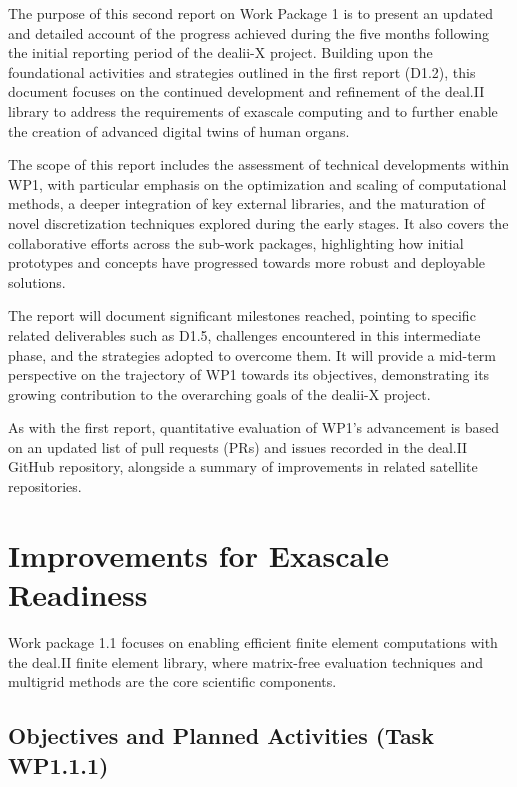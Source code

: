 \documentclass[a4paper,12pt]{article}
\begin{document}
The purpose of this second report on Work Package 1 is to present an updated and detailed account of the progress achieved during the five months following the initial reporting period of the dealii-X project. Building upon the foundational activities and strategies outlined in the first report (D1.2), this document focuses on the continued development and refinement of the deal.II library to address the requirements of exascale computing and to further enable the creation of advanced digital twins of human organs.

The scope of this report includes the assessment of technical developments within WP1, with particular emphasis on the optimization and scaling of computational methods, a deeper integration of key external libraries, and the maturation of novel discretization techniques explored during the early stages. It also covers the collaborative efforts across the sub-work packages, highlighting how initial prototypes and concepts have progressed towards more robust and deployable solutions.

The report will document significant milestones reached, pointing to specific related deliverables such as D1.5, challenges encountered in this intermediate phase, and the strategies adopted to overcome them. It will provide a mid-term perspective on the trajectory of WP1 towards its objectives, demonstrating its growing contribution to the overarching goals of the dealii-X project.

As with the first report, quantitative evaluation of WP1's advancement is based on an updated list of pull requests (PRs) and issues recorded in the deal.II GitHub repository, alongside a summary of improvements in related satellite repositories.%

\section{Improvements for Exascale Readiness}

Work package 1.1 focuses on enabling efficient finite element computations
with the deal.II finite element library, where matrix-free evaluation
techniques and multigrid methods are the core scientific components.

\subsection{Objectives and Planned Activities (Task WP1.1.1)}
\end{document}
